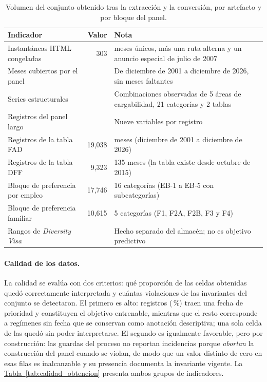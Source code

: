 \documentclass[12pt,letterpaper]{report}
\begin{document}
\begin{table}[htbp]
\centering
\footnotesize
\caption[Cantidad de datos obtenidos]{Volumen del conjunto obtenido tras la extracción y la
conversión, por artefacto y por bloque del panel.}
\label{tab:censo_obtencion}
\begin{tabular}{p{6.3cm}r p{6.0cm}}
\toprule
\rowcolor{uacjblue!15}
\textbf{Indicador} & \textbf{Valor} & \textbf{Nota} \\ \midrule
Instantáneas HTML congeladas & 303 & \factNMonths{} meses únicos, más una ruta alterna y un anuncio especial de julio de 2007 \\
Meses cubiertos por el panel & \factNMonths{} & De diciembre de 2001 a diciembre de 2026, sin meses faltantes \\
Series estructurales & \factNSeriesStructural{} & Combinaciones observadas de 5 áreas de cargabilidad, 21 categorías y 2 tablas \\
Registros del panel largo & \factNObsFmt{} & Nueve variables por registro \\
Registros de la tabla FAD & 19{,}038 & \factNMonths{} meses (diciembre de 2001 a diciembre de 2026) \\
Registros de la tabla DFF & 9{,}323 & 135 meses (la tabla existe desde octubre de 2015) \\
Bloque de preferencia por empleo & 17{,}746 & 16 categorías (EB-1 a EB-5 con subcategorías) \\
Bloque de preferencia familiar & 10{,}615 & 5 categorías (F1, F2A, F2B, F3 y F4) \\
Rangos de \textit{Diversity Visa} & \factDvNRowsFmt{} & Hecho separado del almacén; no es objetivo predictivo \\
\bottomrule
\end{tabular}
\end{table}

\paragraph{Calidad de los datos.} La calidad se evalúa con dos criterios: qué proporción de
las celdas obtenidas quedó correctamente interpretada y cuántas violaciones de las
invariantes del conjunto se detectaron. El primero es alto: \factNObsFFmt{} registros
(\factPctTrainableF{}\,\%) traen una fecha de prioridad y constituyen el objetivo entrenable,
mientras que el resto corresponde a regímenes sin fecha que se conservan como anotación
descriptiva; una sola celda de las \factNObsFmt{} quedó sin poder interpretarse. El segundo
es igualmente favorable, pero por construcción: las guardas del proceso no reportan
incidencias porque \textit{abortan} la construcción del panel cuando se violan, de modo que
un valor distinto de cero en esas filas es inalcanzable y su presencia documenta la
invariante vigente. La \hyperref[tab:calidad_obtencion]{Tabla~\ref*{tab:calidad_obtencion}} presenta ambos grupos de
indicadores.
\end{document}
